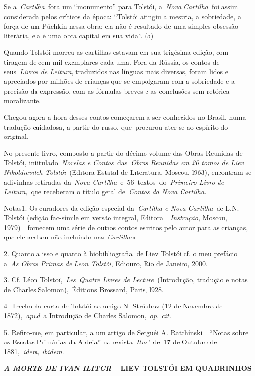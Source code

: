 Se a~\emph{Cartilha~}fora um ``monumento'' para Tolstói, a~\emph{Nova
Cartilha}~foi assim considerada pelos críticos da época: ``Tolstói
atingiu a mestria, a sobriedade, a força de um Púchkin nessa obra: ela
não é resultado de uma simples obsessão literária, ela é uma obra
capital em sua vida''. (5)

Quando Tolstói morreu as cartilhas estavam em sua trigésima edição, com
tiragem de cem mil exemplares cada uma. Fora da Rússia, os contos de
seus~\emph{Livros de Leitura}, traduzidos nas línguas mais diversas,
foram lidos e apreciados por milhões de crianças que se empolgaram com a
sobriedade e a precisão da expressão, com as fórmulas breves e as
conclusões sem retórica moralizante.

Chegou agora a hora desses contos começarem a ser conhecidos no Brasil,
numa tradução cuidadosa, a partir do russo, que~procurou ater-se ao
espírito do original.

No presente livro, composto a partir do décimo volume das Obras Reunidas
de Tolstói, intitulado~\emph{Novelas e Contos~}das~\emph{Obras Reunidas
em 20 tomos de Liev Nikoláievitch Tolstói}~(Editora Estatal de
Literatura, Moscou, l963), encontram-se adivinhas retiradas
da~\emph{Nova Cartilha~}e~56~textos\emph{~}do~\emph{Primeiro Livro de
Leitura,}~que receberam o título geral de~\emph{Contos da Nova
Cartilha.}

Notas1. Os curadores da edição especial da~\emph{Cartilha e Nova
Cartilha~}de L.N. Tolstói (edição fac-símile em versão integral,
Editora~~\emph{Instrução}, Moscou, 1979)~~fornecem uma série de outros
contos escritos pelo autor para as crianças, que ele acabou não
incluindo nas~\emph{Cartilhas.}

2. Quanto a isso e quanto à biobibliografia\textbf{~}de Liev Tolstói cf.
o meu prefácio a~\emph{As Obras Primas de Leon Tolstói}, Ediouro, Rio de
Janeiro, 2000.~

3. Cf. Léon Tolstoï,~\emph{Les}~\emph{Quatre Livres de
Lecture~}(Introdução, tradução e notas de Charles Salomon),~Éditions
Brossard, Paris, l928.

4. Trecho da carta de Tolstói ao amigo N. Strákhov (12 de Novembro de
1872),~\emph{apud}~a Introdução de Charles Salomon,~\emph{op. cit.}

5. Refiro-me, em particular, a um artigo de Serguéi A.
Ratchínski~~``Notas sobre as Escolas Primárias da Aldeia'' na
revista~\emph{Rus'}~de~17 de Outubro de 1881,~\emph{idem, ibidem}.

\textbf{\emph{A MORTE DE IVAN ILITCH} -- LIEV TOLSTÓI EM QUADRINHOS}

